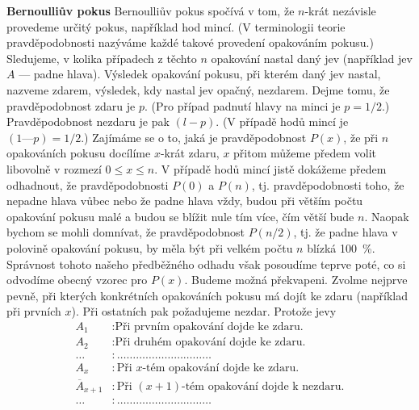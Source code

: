 \wikitextrule
\begin{example}\label{mai:exam052}
  \textbf{Bernoulliův pokus}\newline\small
  Bernoulliův pokus spočívá v tom, že \(n\)-krát nezávisle provedeme určitý pokus, například hod 
  mincí. (V terminologii teorie pravděpodobnosti nazýváme každé takové provedení opakováním 
  pokusu.) Sledujeme, v kolika případech z těchto \(n\) opakování nastal daný jev (například jev 
  \(A\) — padne hlava). Výsledek opakování pokusu, při kterém daný jev nastal, nazveme zdarem, 
  výsledek, kdy nastal jev opačný, nezdarem. Dejme tomu, že pravděpodobnost zdaru je \(p\). (Pro 
  případ padnutí hlavy na minci je \(p = 1/2\).) Pravděpodobnost nezdaru je pak \((l - p)\).
  (V případě hodů mincí je \((1 — p) = 1/2\).) Zajímáme se o to, jaká je pravděpodobnost \(P(x)\), 
  že při \(n\) opakováních pokusu docílíme \(x\)-krát zdaru, \(x\) přitom můžeme předem volit 
  libovolně v rozmezí \(0 \leq x \leq n\). V případě hodů mincí jistě dokážeme předem odhadnout, 
  že pravděpodobnosti \(P(0)\) a \(P(n)\), tj. pravděpodobnosti toho, že nepadne hlava vůbec nebo 
  že padne hlava vždy, budou při větším počtu opakování pokusu malé a budou se blížit nule tím 
  více, čím větší bude \(n\). Naopak bychom se mohli domnívat, že pravděpodobnost \(P(n/2)\), 
  tj. že padne hlava v polovině opakování pokusu, by měla být při velkém počtu \(n\) blízká 
  \SI{100}{\percent}. Správnost tohoto našeho předběžného odhadu však posoudíme teprve poté, co si 
  odvodíme obecný vzorec pro \(P(x)\). Budeme možná překvapeni. Zvolme nejprve pevně, při kterých 
  konkrétních opakováních pokusu má dojít ke zdaru  (například při prvních \(x\)). Při ostatních 
  pak požadujeme nezdar. Protože jevy
  \begin{align*}
    A_1                &: \text{Při prvním opakování dojde ke zdaru.}                  \\
    A_2                &: \text{Při druhém opakování dojde ke zdaru.}                  \\
    \ldots             &: \ldots\ldots\ldots\ldots\ldots\ldots\ldots\ldots\ldots\ldots \\
    A_x                &: \text{Při \(x\)-tém opakování dojde ke zdaru.}               \\
    \overline{A}_{x+1} &: \text{Při \((x + 1)\)-tém opakování dojde k nezdaru.}        \\
    \ldots             &: \ldots\ldots\ldots\ldots\ldots\ldots\ldots\ldots\ldots\ldots \\

\end{align*}
\end{example}
